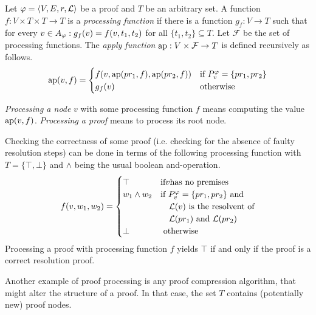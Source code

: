 \begin{definition}
\label{def:proof-processing}

Let $\varphi = \langle V,E,r,\mathcal{L} \rangle$ be a proof and $T$ be an arbitrary set.
A function $f: V \times T \times T \rightarrow T$ is a \emph{processing function} if there is a function $g_f: V \rightarrow T$ such that for every $v \in A_{\varphi}: g_f(v) = f(v,t_1,t_2)$ for all $\{t_1,t_2\} \subseteq T$.
Let $\mathcal{F}$ be the set of processing functions.
The \emph{apply function} $\operatorname{ap}: V \times \mathcal{F} \rightarrow T$ is defined recursively as follows.
$$
\operatorname{ap}(v,f) = 
\begin{cases}
	f(v,\operatorname{ap}(pr_1,f),\operatorname{ap}(pr_2,f)) &\text{if } P_{v}^{\varphi} = \{pr_1,pr_2\} \\
	g_f(v) &\text{otherwise}\\
\end{cases}
$$

\emph{Processing a node} $v$ with some processing function $f$ means computing the value $\operatorname{ap}(v,f)$.
\emph{Processing a proof} means to process its root node.

\end{definition}

\begin{example}

Checking the correctness of some proof (i.e. checking for the absence of faulty resolution steps) can be done in terms of the following processing function with $T = \{\top,\bot\}$ and $\wedge$ being the usual boolean and-operation.
$$
f(v,w_1,w_2) = 
\begin{cases}
	\top & \text{if} v \text{has no premises} \\
	w_1 \wedge w_2 &\text{if } P_{v}^{\varphi} = \{pr_1,pr_2\} \text{ and}\\
								 &\quad \mathcal{L}(v) \text{ is the resolvent of} \\
								 &\quad \mathcal{L}(pr_1) \text{ and } \mathcal{L}(pr_2)\\
	\bot & \text{ otherwise}
\end{cases}
$$
Processing a proof with processing function $f$ yields $\top$ if and only if the proof is a correct resolution proof.
\end{example}

Another example of proof processing is any proof compression algorithm, that might alter the structure of a proof.
In that case, the set $T$ contains (potentially new) proof nodes.